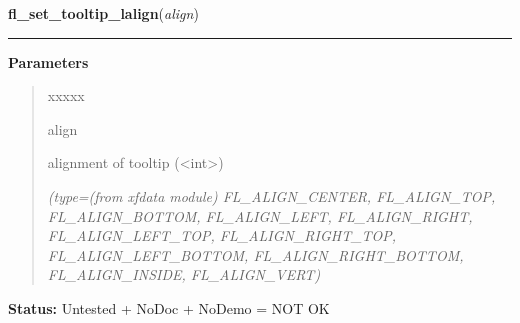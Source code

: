     \label{xformslib:library:fl_set_tooltip_lalign}

    \vspace{0.5ex}

\hspace{.8\funcindent}\begin{boxedminipage}{\funcwidth}

    \raggedright \textbf{fl\_set\_tooltip\_lalign}(\textit{align})

    \vspace{-1.5ex}

    \rule{\textwidth}{0.5\fboxrule}
\setlength{\parskip}{2ex}
\setlength{\parskip}{1ex}
      \textbf{Parameters}
      \vspace{-1ex}

      \begin{quote}
        \begin{Ventry}{xxxxx}

          \item[align]

          alignment of tooltip ({\textless}int{\textgreater})

            {\it (type=(from xfdata module) FL\_ALIGN\_CENTER, FL\_ALIGN\_TOP, FL\_ALIGN\_BOTTOM, 
FL\_ALIGN\_LEFT, FL\_ALIGN\_RIGHT, FL\_ALIGN\_LEFT\_TOP, 
FL\_ALIGN\_RIGHT\_TOP, FL\_ALIGN\_LEFT\_BOTTOM, FL\_ALIGN\_RIGHT\_BOTTOM, 
FL\_ALIGN\_INSIDE, FL\_ALIGN\_VERT)}

        \end{Ventry}

      \end{quote}

\textbf{Status:} Untested + NoDoc + NoDemo = NOT OK



    \end{boxedminipage}

    \label{xformslib:library:fl_exe_command}

    \vspace{0.5ex}

